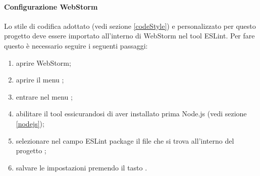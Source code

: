 		\paragraph{Configurazione WebStorm}
		Lo stile di codifica adottato (vedi sezione \ref{codeStyle}) e personalizzato per questo progetto deve essere importato all'interno di WebStorm nel tool ESLint. Per fare questo è necessario seguire i seguenti passaggi:
		\begin{enumerate}
			\item aprire WebStorm;
			\item aprire il menu ;
			\item entrare nel menu ;
			\item abilitare il tool essicurandosi di aver installato prima Node.js (vedi sezione \ref{nodejs});
			\item selezionare nel campo ESLint package il file che si trova all'interno del progetto ;
			\item salvare le impostazioni premendo il tasto .
		\end{enumerate}
		

